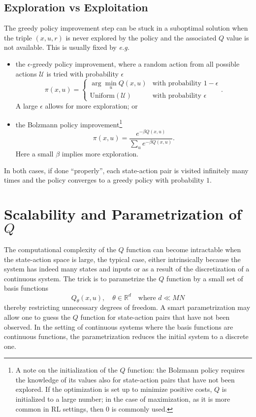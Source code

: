 \subsection{Exploration vs Exploitation}

The greedy policy improvement step can be stuck in a suboptimal solution when the triple $(x,u,r)$ is never explored by the policy and the associated $Q$ value is not available. This is usually fixed by \textit{e.g.}
\begin{itemize}
\item the $\epsilon$-greedy policy improvement, where a random action from all possible actions $\mathcal{U}$ is tried with probability $\epsilon$
  \begin{equation}
    \label{eq:epsilon-greedy-policy-improvement}
    \pi(x,u) =
    \begin{cases}
      \arg \min_u Q(x,u) & \text{with probability }1-\epsilon \\
      \text{Uniform}(\mathcal{U}) & \text{with probability }\epsilon
    \end{cases}.
  \end{equation}
  A large $\epsilon$ allows for more exploration; or
\item the Bolzmann policy improvement\footnote{A note on the initialization of the $Q$ function: the Bolzmann policy requires the knowledge of its values also for state-action pairs that have not been explored. If the optimization is set up to minimize positive costs, $Q$ is initialized to a large number; in the case of maximization, as it is more common in RL settings, then $0$ is commonly used.}
  \begin{equation*}
  \pi(x,u) = \frac{e^{-\beta Q(x,u)}}{\sum_u e^{-\beta Q(x,u)}}.
\end{equation*}
Here a small $\beta$ implies more exploration.
\end{itemize}
In both cases, if done ``properly'', each state-action pair is visited infinitely many times and the policy converges to a greedy policy with probability $1$.

\section{Scalability and Parametrization of $Q$}
\label{sec:RL-Q-parametrization}

The computational complexity of the $Q$ function can become intractable when the state-action space is large, the typical case, either intrinsically because the system has indeed many states and inputs or as a result of the discretization of a continuous system. The trick is to parametrize the $Q$ function by a small set of basis functions
\begin{equation*}
  Q_\theta(x,u),\quad \theta \in\mathbb{R}^d\quad \text{where } d\ll MN
\end{equation*}
thereby restricting unnecessary degrees of freedom. A smart parametrization may allow one to guess the $Q$ function for state-action pairs that have not been observed. In the setting of continuous systems where the basis functions are continuous functions, the parametrization reduces the initial system to a discrete one.

